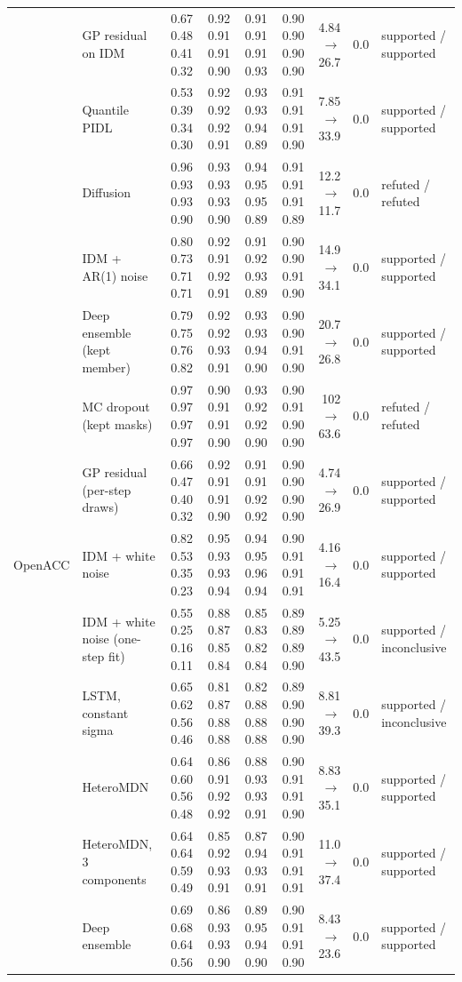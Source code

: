 \begin{table}[htbp]
\begin{tabular}{llrrrrrrl}
 & GP residual on IDM & 0.67 0.48 0.41 0.32 & 0.92 0.91 0.91 0.90 & 0.91 0.91 0.91 0.93 & 0.90 0.90 0.90 0.90 & 4.84 $\rightarrow$ 26.7 & 0.0 & supported / supported \\
 & Quantile PIDL & 0.53 0.39 0.34 0.30 & 0.92 0.92 0.92 0.91 & 0.93 0.93 0.94 0.89 & 0.91 0.91 0.91 0.90 & 7.85 $\rightarrow$ 33.9 & 0.0 & supported / supported \\
 & Diffusion & 0.96 0.93 0.93 0.90 & 0.93 0.93 0.93 0.90 & 0.94 0.95 0.95 0.89 & 0.91 0.91 0.91 0.89 & 12.2 $\rightarrow$ 11.7 & 0.0 & refuted / refuted \\
 & IDM + AR(1) noise & 0.80 0.73 0.71 0.71 & 0.92 0.91 0.92 0.91 & 0.91 0.92 0.93 0.89 & 0.90 0.90 0.91 0.90 & 14.9 $\rightarrow$ 34.1 & 0.0 & supported / supported \\
 & Deep ensemble (kept member) & 0.79 0.75 0.76 0.82 & 0.92 0.92 0.93 0.91 & 0.93 0.93 0.94 0.90 & 0.90 0.90 0.91 0.90 & 20.7 $\rightarrow$ 26.8 & 0.0 & supported / supported \\
 & MC dropout (kept masks) & 0.97 0.97 0.97 0.97 & 0.90 0.91 0.91 0.90 & 0.93 0.92 0.92 0.90 & 0.90 0.91 0.90 0.90 & 102 $\rightarrow$ 63.6 & 0.0 & refuted / refuted \\
 & GP residual (per-step draws) & 0.66 0.47 0.40 0.32 & 0.92 0.91 0.91 0.90 & 0.91 0.91 0.92 0.92 & 0.90 0.90 0.90 0.90 & 4.74 $\rightarrow$ 26.9 & 0.0 & supported / supported \\
\midrule
OpenACC & IDM + white noise & 0.82 0.53 0.35 0.23 & 0.95 0.93 0.93 0.94 & 0.94 0.95 0.96 0.94 & 0.90 0.91 0.91 0.91 & 4.16 $\rightarrow$ 16.4 & 0.0 & supported / supported \\
 & IDM + white noise (one-step fit) & 0.55 0.25 0.16 0.11 & 0.88 0.87 0.85 0.84 & 0.85 0.83 0.82 0.84 & 0.89 0.89 0.89 0.90 & 5.25 $\rightarrow$ 43.5 & 0.0 & supported / inconclusive \\
 & LSTM, constant sigma & 0.65 0.62 0.56 0.46 & 0.81 0.87 0.88 0.88 & 0.82 0.88 0.88 0.88 & 0.89 0.90 0.90 0.90 & 8.81 $\rightarrow$ 39.3 & 0.0 & supported / inconclusive \\
 & HeteroMDN & 0.64 0.60 0.56 0.48 & 0.86 0.91 0.92 0.92 & 0.88 0.93 0.93 0.91 & 0.90 0.91 0.91 0.90 & 8.83 $\rightarrow$ 35.1 & 0.0 & supported / supported \\
 & HeteroMDN, 3 components & 0.64 0.64 0.59 0.49 & 0.85 0.92 0.93 0.91 & 0.87 0.94 0.93 0.91 & 0.90 0.91 0.91 0.91 & 11.0 $\rightarrow$ 37.4 & 0.0 & supported / supported \\
 & Deep ensemble & 0.69 0.68 0.64 0.56 & 0.86 0.93 0.93 0.90 & 0.89 0.95 0.94 0.90 & 0.90 0.91 0.91 0.90 & 8.43 $\rightarrow$ 23.6 & 0.0 & supported / supported \\

\end{tabular}
\end{table}
